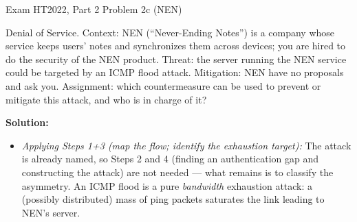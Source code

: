 \documentclass[12pt, a4paper]{article}
\begin{document}
\begin{practicebox}{Exam HT2022, Part 2 Problem 2c (NEN)}
\begin{problembox}
Denial of Service. Context: NEN (``Never-Ending Notes'') is a company whose service keeps users' notes and synchronizes them across devices; you are hired to do the security of the NEN product. Threat: the server running the NEN service could be targeted by an ICMP flood attack. Mitigation: NEN have no proposals and ask you. Assignment: which countermeasure can be used to prevent or mitigate this attack, and who is in charge of it?
\end{problembox}

\textbf{Solution:}
\begin{itemize}
    \item \textit{Applying Steps 1+3 (map the flow; identify the exhaustion target):} The attack is already named, so Steps 2 and 4 (finding an authentication gap and constructing the attack) are not needed --- what remains is to classify the asymmetry.
    An ICMP flood is a pure \emph{bandwidth} exhaustion attack: a (possibly distributed) mass of ping packets saturates the link leading to NEN's server.


\end{itemize}
\end{practicebox}
\end{document}
